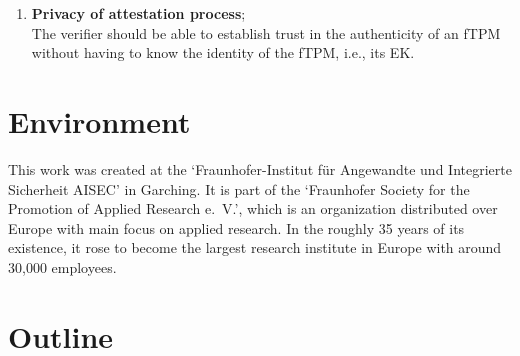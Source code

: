 \begin{enumerate}
  \item{\textbf{Privacy of attestation process};\\
  The verifier should be able to establish trust in the authenticity of an fTPM without having to know the identity of the fTPM, i.e., its EK\@.
  }
\end{enumerate}



\section{Environment}

This work was created at the `Fraunhofer-Institut für Angewandte und Integrierte Sicherheit AISEC' in Garching.
It is part of the `Fraunhofer Society for the Promotion of Applied Research e.~V.', which is an organization distributed over Europe with main focus on applied research.
In the roughly 35 years of its existence, it rose to become the largest research institute in Europe with around 30,000 employees.

\section{Outline}

